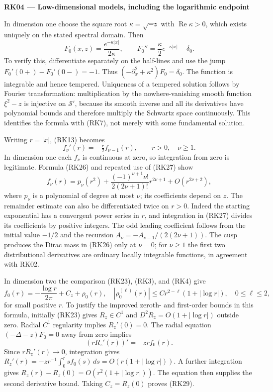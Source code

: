 \documentclass[
  11pt,
]{article}
\begin{document}
\textbf{RK04 --- Low-dimensional models, including the logarithmic
endpoint}

In dimension one choose the square root \(\kappa=\sqrt{-z}\) with
\(\operatorname{Re}\kappa>0\), which exists uniquely on the stated
spectral domain. Then \[
 F_0(x,z)=\frac{e^{-\kappa|x|}}{2\kappa},\qquad
 F_0''=\frac{\kappa}{2}e^{-\kappa|x|}-\delta_0.
 \tag{RK26}
\] To verify this, differentiate separately on the half-lines and use
the jump \(F_0'(0+)-F_0'(0-)=-1\). Thus
\((-\partial_x^2+\kappa^2)F_0=\delta_0\). The function is integrable and
hence tempered. Uniqueness of a tempered solution follows by Fourier
transformation: multiplication by the nowhere-vanishing smooth function
\(\xi^2-z\) is injective on \(\mathcal S'\), because its smooth inverse
and all its derivatives have polynomial bounds and therefore multiply
the Schwartz space continuously. This identifies the formula with (RK7),
not merely with some fundamental solution.

Writing \(r=|x|\), (RK13) becomes \[
 f_\nu'(r)=-\tfrac r2 f_{\nu-1}(r),\qquad r>0,\quad \nu\geq1.
 \tag{RK27}
\] In dimension one each \(f_\nu\) is continuous at zero, so integration
from zero is legitimate. Formula (RK26) and repeated use of (RK27) show
\[
 f_\nu(r)=p_\nu(r^2)
 +\frac{(-1)^{\nu+1}\nu!}{2(2\nu+1)!}r^{2\nu+1}
 +O(r^{2\nu+2}),
 \tag{RK28}
\] where \(p_\nu\) is a polynomial of degree at most \(\nu\); its
coefficients depend on \(z\). The remainder estimate can also be
differentiated twice on \(r>0\). Indeed the starting exponential has a
convergent power series in \(r\), and integration in (RK27) divides its
coefficients by positive integers. The odd leading coefficient follows
from the initial value \(-1/2\) and the recursion
\(A_\nu=-A_{\nu-1}/(2(2\nu+1))\). The cusp produces the Dirac mass in
(RK26) only at \(\nu=0\); for \(\nu\geq1\) the first two distributional
derivatives are ordinary locally integrable functions, in agreement with
RK02.

In dimension two the comparison (RK23), (RK3), and (RK4) give \[
 f_0(r)=-\frac{\log r}{2\pi}+C_z+\rho_0(r),
 \quad
 |\rho_0^{(\ell)}(r)|
 \leq C r^{2-\ell}(1+|\log r|),\quad 0\leq\ell\leq2,
 \tag{RK29}
\] for small positive \(r\). To justify the improved zeroth- and
first-order bounds in this formula, initially (RK23) gives
\(R_z\in C^1\) and \(D^2R_z=O(1+|\log r|)\) outside zero. Radial \(C^1\)
regularity implies \(R_z'(0)=0\). The radial equation
\((-\Delta-z)F_0=0\) away from zero implies \[
 (rR_z'(r))'=-z r f_0(r).
\] Since \(rR_z'(r)\to0\), integration gives
\(R_z'(r)=-z r^{-1}\int_0^r s f_0(s)\,ds
=O(r(1+|\log r|))\). A further integration gives
\(R_z(r)-R_z(0)=O(r^2(1+|\log r|))\). The equation then supplies the
second derivative bound. Taking \(C_z=R_z(0)\) proves (RK29).
\end{document}
